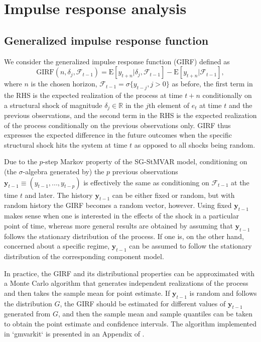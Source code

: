 \documentclass[nojss]{jss} %
\begin{document}
\section{Impulse response analysis}

\subsection{Generalized impulse response function}
We consider the generalized impulse response function (GIRF) \cite{Koop+Pesaran+Potter:1996} defined as
\begin{equation}\label{eq:girf}
\text{GIRF}(n,\delta_j,\mathcal{F}_{t-1}) = \text{E}[y_{t+n}|\delta_j,\mathcal{F}_{t-1}] - \text{E}[y_{t+n}|\mathcal{F}_{t-1}],
\end{equation}
where $n$ is the chosen horizon, $\mathcal{F}_{t-1}=\sigma\lbrace y_{t-j},j>0\rbrace$ as before, the first term in the RHS is the expected realization of the process at time $t+n$ conditionally on a structural shock of magnitude $\delta_j \in\mathbb{R}$ in the $j$th element of $e_t$ at time $t$ and the previous observations, and the second term in the RHS is the expected realization of the process conditionally on the previous observations only. GIRF thus expresses the expected difference in the future outcomes when the specific structural shock hits the system at time $t$ as opposed to all shocks being random.

Due to the $p$-step Markov property of the SG-StMVAR model, conditioning on (the $\sigma$-algebra generated by) the $p$ previous observations $\boldsymbol{y}_{t-1}\equiv(y_{t-1},...,y_{t-p})$ is effectively the same as conditioning on $\mathcal{F}_{t-1}$ at the time $t$ and later. The history $\boldsymbol{y}_{t-1}$ can be either fixed or random, but with random history the GIRF becomes a random vector, however. Using fixed $\boldsymbol{y}_{t-1}$ makes sense when one is interested in the effects of the shock in a particular point of time, whereas more general results are obtained by assuming that $\boldsymbol{y}_{t-1}$ follows the stationary distribution of the process. If one is, on the other hand, concerned about a specific regime, $\boldsymbol{y}_{t-1}$ can be assumed to follow the stationary distribution of the corresponding component model.

In practice, the GIRF and its distributional properties can be approximated with a Monte Carlo algorithm that generates independent realizations of the process and then takes the sample mean for point estimate. If $\boldsymbol{y}_{t-1}$ is random and follows the distribution $G$, the GIRF should be estimated for different values of $\boldsymbol{y}_{t-1}$ generated from $G$, and then the sample mean and sample quantiles can be taken to obtain the point estimate and confidence intervals. The algorithm implemented in `gmvarkit` is presented in an Appendix of \cite{Virolainen:2020}.
\end{document}
